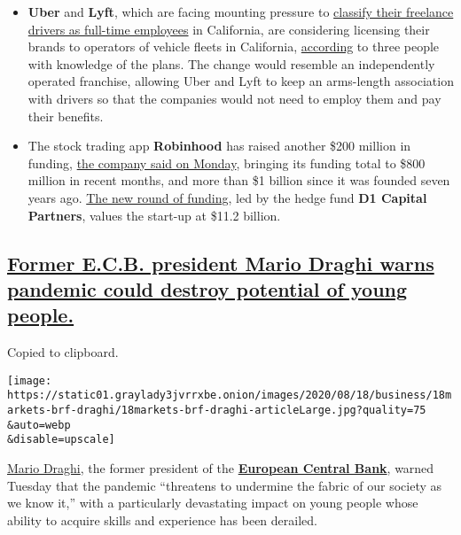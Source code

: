 \begin{itemize}
\item
  \textbf{Uber} and \textbf{Lyft}, which are facing mounting pressure to
  \href{https://www.nytimes3xbfgragh.onion/2019/09/11/technology/california-gig-economy-bill.html}{classify
  their freelance drivers as full-time employees} in California, are
  considering licensing their brands to operators of vehicle fleets in
  California,
  \href{https://www.nytimes3xbfgragh.onion/2020/08/18/technology/uber-lyft-franchise-california.html}{according}
  to three people with knowledge of the plans. The change would resemble
  an independently operated franchise, allowing Uber and Lyft to keep an
  arms-length association with drivers so that the companies would not
  need to employ them and pay their benefits.
\item
  The stock trading app \textbf{Robinhood} has raised another \$200
  million in funding,
  \href{https://blog.robinhood.com/news/2020/8/17/series-g}{the company
  said on Monday}, bringing its funding total to \$800 million in recent
  months, and more than \$1 billion since it was founded seven years
  ago.
  \href{https://www.nytimes3xbfgragh.onion/live/2020/08/17/business/stock-market-today-coronavirus/robinhood-a-stock-trading-app-is-valued-at-11-2-billion-in-its-latest-funding-round}{The
  new round of funding}, led by the hedge fund \textbf{D1 Capital
  Partners}, values the start-up at \$11.2 billion.
\end{itemize}

\hypertarget{former-ecb-president-mario-draghi-warns-pandemic-could-destroy-potential-of-young-people}{%
\subsection{\texorpdfstring{\protect\hyperlink{former-ecb-president-mario-draghi-warns-pandemic-could-destroy-potential-of-young-people}{Former
E.C.B. president Mario Draghi warns pandemic could destroy potential of
young
people.}}{Former E.C.B. president Mario Draghi warns pandemic could destroy potential of young people.}}\label{former-ecb-president-mario-draghi-warns-pandemic-could-destroy-potential-of-young-people}}

Copied to clipboard.

\texttt{[image: https://static01.graylady3jvrrxbe.onion/images/2020/08/18/business/18markets-brf-draghi/18markets-brf-draghi-articleLarge.jpg?quality=75\\\&auto=webp\\\&disable=upscale]}

\href{https://www.nytimes3xbfgragh.onion/2019/10/24/business/mario-draghi-ecb.html}{Mario
Draghi}, the former president of the
\textbf{\href{https://www.nytimes3xbfgragh.onion/topic/organization/european-central-bank}{European
Central Bank}}, warned Tuesday that the pandemic ``threatens to
undermine the fabric of our society as we know it,'' with a particularly
devastating impact on young people whose ability to acquire skills and
experience has been derailed.

